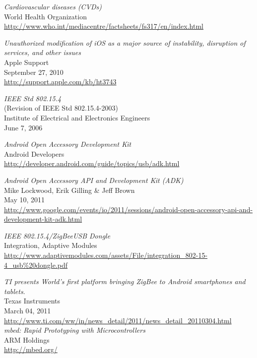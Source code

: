 \begin{thebibliography}{widest-label}
	\emph{Cardiovascular diseases (CVDs)}\\
	World Health Organization\\
	\url{http://www.who.int/mediacentre/factsheets/fs317/en/index.html}
	
	\emph{Unauthorized modification of iOS as a major source of instability, disruption of services, and other issues}\\
	Apple Support\\
	September 27, 2010\\
	\url{http://support.apple.com/kb/ht3743}
	
	\emph{IEEE Std 802.15.4}\\
	(Revision of IEEE Std 802.15.4-2003)\\
	Institute of Electrical and Electronics Engineers\\
	June 7, 2006
	
	\emph{Android Open Accessory Development Kit}\\
	Android Developers\\
	\url{http://developer.android.com/guide/topics/usb/adk.html}
	
	\emph{Android Open Accessory API and Development Kit (ADK)}\\
	Mike Lockwood, Erik Gilling \& Jeff Brown\\
	May 10, 2011\\
	\url{http://www.google.com/events/io/2011/sessions/android-open-accessory-api-and-development-kit-adk.html}
	
	\emph{IEEE 802.15.4/ZigBee\texttrademark USB Dongle}\\
	Integration, Adaptive Modules\\
	\url{http://www.adaptivemodules.com/assets/File/integration_802-15-4_usb\%20dongle.pdf}	

	\emph{TI presents World’s first platform bringing ZigBee to Android smartphones and tablets}.\\
 	Texas Instruments\\
	March 04, 2011\\
 	\url{http://www.ti.com/ww/in/news_detail/2011/news_detail_20110304.html}\\
 	
	\emph{mbed: Rapid Prototyping with Microcontrollers}\\
	ARM Holdings\\
	\url{http://mbed.org/}
	

\end{thebibliography}
